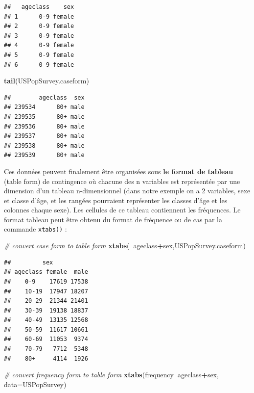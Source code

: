 \documentclass[12pt,]{book}
\newenvironment{Shaded}{\begin{snugshade}}{\end{snugshade}}
\newcommand{\CommentTok}[1]{\textcolor[rgb]{0.56,0.35,0.01}{\textit{#1}}}
\newcommand{\DataTypeTok}[1]{\textcolor[rgb]{0.13,0.29,0.53}{#1}}
\newcommand{\KeywordTok}[1]{\textcolor[rgb]{0.13,0.29,0.53}{\textbf{#1}}}
\newcommand{\NormalTok}[1]{#1}
\newcommand{\OperatorTok}[1]{\textcolor[rgb]{0.81,0.36,0.00}{\textbf{#1}}}
\begin{document}
\begin{verbatim}
##   ageclass    sex
## 1      0-9 female
## 2      0-9 female
## 3      0-9 female
## 4      0-9 female
## 5      0-9 female
## 6      0-9 female
\end{verbatim}

\begin{Shaded}
\begin{Highlighting}[]
\KeywordTok{tail}\NormalTok{(USPopSurvey.caseform)}
\end{Highlighting}
\end{Shaded}

\begin{verbatim}
##        ageclass  sex
## 239534      80+ male
## 239535      80+ male
## 239536      80+ male
## 239537      80+ male
## 239538      80+ male
## 239539      80+ male
\end{verbatim}

Ces données peuvent finalement être organisées sous \textbf{le format de tableau} (table form) de contingence où chacune des n variables est représentée par une dimension d'un tableau n-dimensionnel (dans notre exemple on a 2 variables, sexe et classe d'âge, et les rangées pourraient représenter les classes d'âge et les colonnes chaque sexe). Les cellules de ce tableau contiennent les fréquences. Le format tableau peut être obtenu du format de fréquence ou de cas par la commande \texttt{xtabs()} :

\begin{Shaded}
\begin{Highlighting}[]
\CommentTok{# convert case form to table form}
\KeywordTok{xtabs}\NormalTok{(}\OperatorTok{~}\NormalTok{ageclass}\OperatorTok{+}\NormalTok{sex,USPopSurvey.caseform)}
\end{Highlighting}
\end{Shaded}

\begin{verbatim}
##         sex
## ageclass female  male
##    0-9    17619 17538
##    10-19  17947 18207
##    20-29  21344 21401
##    30-39  19138 18837
##    40-49  13135 12568
##    50-59  11617 10661
##    60-69  11053  9374
##    70-79   7712  5348
##    80+     4114  1926
\end{verbatim}

\begin{Shaded}
\begin{Highlighting}[]
\CommentTok{# convert frequency form to table form}
\KeywordTok{xtabs}\NormalTok{(frequency}\OperatorTok{~}\NormalTok{ageclass}\OperatorTok{+}\NormalTok{sex, }\DataTypeTok{data=}\NormalTok{USPopSurvey)}
\end{Highlighting}
\end{Shaded}
\end{document}
